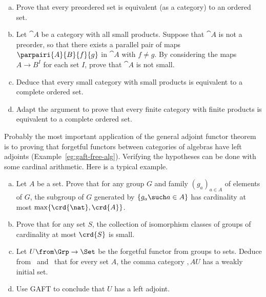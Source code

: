 \begin{question}        
\label{ex:small-complete}
\begin{enumerate}[(b)]
\item 
Prove that every preordered%
%
%
set is equivalent (as a category) to an ordered set.

\item 
Let $\cat{A}$ be a category with all small products.  Suppose that
$\cat{A}$ is not a preorder, so that there exists a parallel pair of maps
$\parpairi{A}{B}{f}{g}$ in $\cat{A}$ with $f \neq g$.  By considering the
maps $A \to B^I$ for each set $I$, prove that $\cat{A}$ is not small.

\item 
Deduce that every small category with small products is equivalent to a
complete ordered set.%
%
%

\item 
Adapt the argument to prove that every finite category with finite
products is equivalent to a complete ordered set.
\end{enumerate}
\end{question}


\begin{question}        
\label{ex:free-gp-card}
Probably the most important application of the general adjoint functor
theorem is to proving that forgetful functors between categories of
algebras have left adjoints (Example~\ref{eg:gaft-free-alg}).  Verifying
the hypotheses can be done with some cardinal%
%
%
%
arithmetic.  Here is a typical example.
% 
\begin{enumerate}[(b)]
\item   
\label{part:gen-subgp-bound}
Let $A$ be a set.  Prove that for any group $G$ and family $(g_a)_{a \in
A}$ of elements of $G$, the subgroup of $G$ generated by $\{g_a \such a
\in A\}$ has cardinality at most $\max \{\crd{\nat}, \crd{A}\}$.

\item   
\label{part:small-coll-gps}
Prove that for any set $S$, the collection of isomorphism classes of groups
of cardinality at most $\crd{S}$ is small.

\item 
Let $U\from \Grp \to \Set$%
%
%
be the forgetful functor from groups to sets.  Deduce
from~ and~ that for
every set $A$, the comma category $\comma{A}{U}$ has a weakly initial set.

\item 
Use GAFT to conclude that $U$ has a left adjoint.
\end{enumerate}
\end{question}


